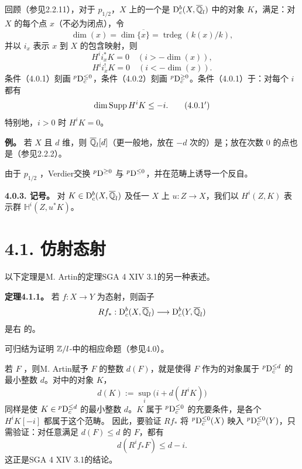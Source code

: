 回顾（参见2.2.11），对于 $p_{1/2}$，$X$ 上的一个是 $\mathrm{D}_c^b(X,\overline{\mathbb Q}_l)$ 中的对象 $K$，满足：对 $X$ 的每个点 $x$（不必为闭点），令
\[\dim(x)=\dim\overline{\{x\}}=\operatorname{trdeg}(k(x)/k),\]
并以 $i_x$ 表示 $x$ 到 $X$ 的包含映射，则
\begin{equation*}H^i i_x^*K=0\quad(i>-\dim(x)),\tag{4.0.1}\end{equation*}
\begin{equation*}H^i i_x^!K=0\quad(i<-\dim(x)).\tag{4.0.2}\end{equation*}
条件（4.0.1）刻画 ${}^p\mathrm{D}_c^{\le0}$，条件（4.0.2）刻画 ${}^p\mathrm{D}_c^{\ge0}$。条件（4.0.1）于：对每个 $i$ 都有
\begin{equation*}\dim\operatorname{Supp} H^iK\le-i.\tag{4.0.1$'$}\end{equation*}
特别地，$i>0$ 时 $H^iK=0$。

\noindent\textbf{例。} 若 $X$ 且 $d$ 维，则 $\overline{\mathbb Q}_l[d]$（更一般地，放在 $-d$ 次的）是；放在次数 $0$ 的点也是（参见2.2.2）。

由于 $p_{1/2}$ ，Verdier交换 ${}^p\mathrm{D}^{\ge0}$ 与 ${}^p\mathrm{D}^{\le0}$，并在范畴上诱导一个反自。

\par\medskip\noindent\textbf{4.0.3. 记号。} 对 $K\in\mathrm{D}_c^b(X,\overline{\mathbb Q}_l)$ 及任一 $X$ 上 $u:Z\to X$，我们以 $H^i(Z,K)$ 表示群 $\mathbb H^i(Z,u^*K)$。

\section*{4.1. 仿射态射}
以下定理是M. Artin的定理SGA 4 XIV 3.1的另一种表述。

\par\medskip\noindent\textbf{定理4.1.1。} 若 $f:X\to Y$ 为态射，则函子
\[Rf_*:\mathrm{D}_c^b(X,\overline{\mathbb Q}_l)\longrightarrow\mathrm{D}_c^b(Y,\overline{\mathbb Q}_l)\]
是右 的。

可归结为证明 $\mathbb Z/l$-中的相应命题（参见4.0）。

若 $F$ ，则M. Artin赋予 $F$ 的整数 $d(F)$，就是使得 $F$ 作为的对象属于 ${}^p\mathrm{D}_c^{\le d}$ 的最小整数 $d$。对中的对象 $K$，
\[d(K):=\sup_i\bigl(i+d(H^iK)\bigr)\]
同样是使 $K\in{}^p\mathrm{D}_c^{\le d}$ 的最小整数 $d$。$K$ 属于 ${}^p\mathrm{D}_c^{\le0}$ 的充要条件，是各个 $H^iK[-i]$ 都属于这个范畴。
因此，要验证 $Rf_*$ 将 ${}^p\mathrm{D}_c^{\le0}(X)$ 映入 ${}^p\mathrm{D}_c^{\le0}(Y)$，只需验证：对任意满足 $d(F)\le d$ 的 $F$，都有
\[d(R^if_*F)\le d-i.\]
这正是SGA 4 XIV 3.1的结论。

